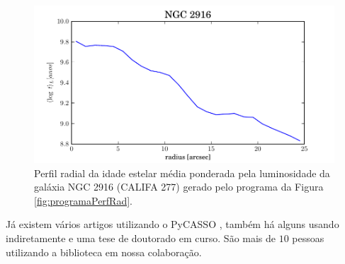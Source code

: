 \begin{figure}
	\includegraphics{figuras/at_flux_radprof.pdf}
	\caption[Perfil radial da idade estelar média da galáxia NGC 2916]
	{Perfil radial da idade estelar média ponderada pela luminosidade da galáxia
	NGC 2916 (CALIFA 277) gerado pelo programa da Figura \ref{fig:programaPerfRad}.}
	\label{fig:perfRad}
\end{figure}

Já existem vários artigos utilizando o PyCASSO \citep{CidFernandes2013I,
CidFernandes2013II, Perez2013, GonzalezDelgado2013}, também há alguns usando
indiretamente \citep{Husemann2013, IglesiasParamo2013} e uma tese de doutorado
em curso. São mais de $10$ pessoas utilizando a biblioteca em nossa colaboração.


